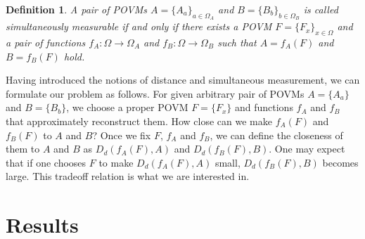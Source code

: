 \documentclass[showpacs,preprintnumbers,amsmath,amssymb]{revtex4}
\newtheorem{definition}{Definition}
\begin{document}
\begin{definition}
A pair of POVMs $A=\{A_a\}_{a\in \Omega_A}$ and $B=\{B_b\}_{b \in \Omega_B}$
is called simultaneously measurable if and only if 
there exists a POVM $F=\{F_x\}_{x \in \Omega}$ and a pair of 
functions $f_A: \Omega \to \Omega_A$ and $f_B: \Omega \to \Omega_B$ 
such that $A=f_A(F)$ and $B=f_B(F)$ hold. 
\end{definition}
\par
Having introduced the notions of distance and simultaneous 
measurement, we can formulate our problem as follows.
For given arbitrary pair of POVMs $A=\{A_a\}$ and $B=\{B_b\}$, 
we choose a proper POVM $F=\{F_x\}$ and functions $f_A$ and $f_B$ 
that approximately
 reconstruct them. How close can we make
  $f_A(F)$ and $f_B(F)$ 
 to $A$ and $B$? 
 Once we fix $F$, $f_A$ and $f_B$, we can define 
 the closeness of them to $A$ and $B$ as $D_d(f_A(F),A)$ and 
 $D_d(f_B(F), B)$. 
 One may expect that if one chooses $F$ to make 
 $D_d(f_A(F),A)$ small, $D_d(f_B(F),B)$ becomes 
 large. This tradeoff relation is what we are interested in. 
 \section{Results}\label{sec:main}
\end{document}
